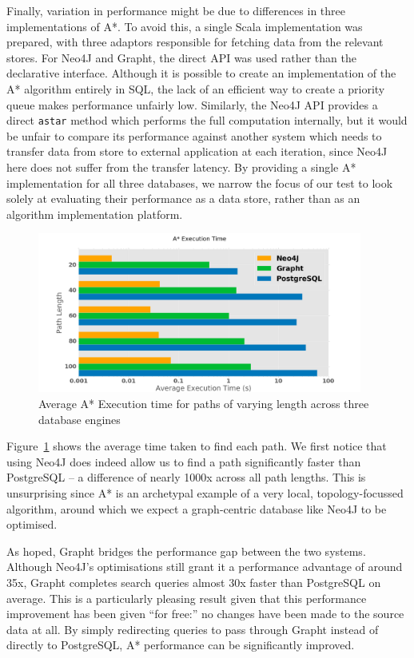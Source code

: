 Finally, variation in performance might be due to differences in three
implementations of A*. To avoid this, a single Scala implementation was prepared, with three
adaptors responsible for fetching data from the relevant stores. For Neo4J and
Grapht, the direct API was used rather than the declarative interface.
Although it is possible to create an implementation of the A* algorithm
entirely in SQL, the lack of an efficient way to create a priority queue makes
performance unfairly low. Similarly, the Neo4J API provides a direct
\texttt{astar} method which performs the full computation internally, but it
would be unfair to compare its performance against another system which needs
to transfer data from store to external application at each iteration, since
Neo4J here does not suffer from the transfer latency. By providing a single A*
implementation for all three databases, we narrow the focus of our test to look solely at 
evaluating their performance as a data store, rather than as an algorithm implementation
platform.

\begin{figure}[htbp]
	\centering
	\includegraphics[width=0.95\textwidth]{figs/astargraph.eps}
	\caption{Average A* Execution time for paths of varying length across three database engines}
	\label{fig:astargraph}
\end{figure}

Figure~\ref{fig:astargraph} shows the average time taken to find each path.
 We
first notice that using Neo4J does indeed allow us to find a path significantly faster
than PostgreSQL -- a difference of nearly 1000x across all path lengths. This is
unsurprising since A* is an archetypal example of a very local, topology-focussed algorithm, around which we expect a graph-centric database like Neo4J to
be optimised. 

As hoped, Grapht bridges the performance gap between the two systems. Although
Neo4J's optimisations still grant it a performance advantage of around 35x,
Grapht completes search queries almost 30x faster than PostgreSQL on average. 
This is a particularly pleasing result given that this performance improvement 
has been given ``for free:'' no changes have been made to the source data at all.
By simply redirecting queries to pass through Grapht instead of
directly to PostgreSQL, A* performance can be significantly improved.

